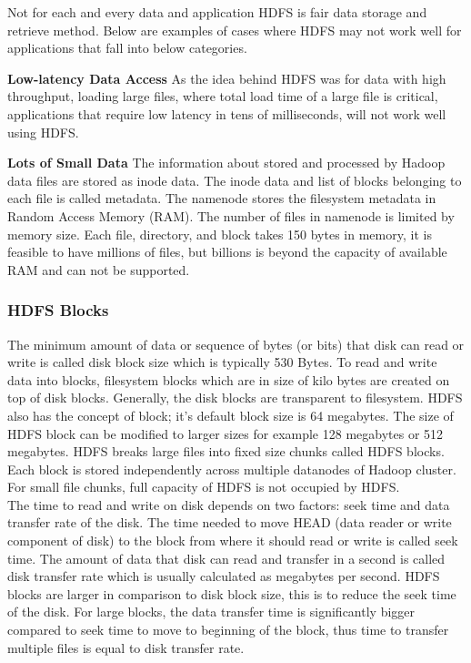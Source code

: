  Not for each and every data and application HDFS‌ is fair data storage and retrieve method. Below are examples of cases where HDFS‌ may not work well for applications that fall into below categories. \  

\textbf{Low-latency Data Access } As the idea behind HDFS was for data with high throughput, loading large files, where total load time of a large file is critical, applications that require low latency in tens of milliseconds, will not work well using HDFS.
 
\textbf{Lots of Small Data } The information about stored and processed by Hadoop data files are stored as inode data. The inode data and list of blocks belonging to each file is called metadata. The namenode stores the filesystem metadata in Random Access Memory (RAM). The number of files in namenode is limited by memory size. Each file, directory, and block takes 150 bytes in memory, it is feasible to have millions of files, but billions is beyond the capacity of available RAM and can not be supported.
   
\subsubsection{HDFS Blocks}
 
The minimum amount of data or sequence of bytes (or bits) that disk can read or write is called disk block size which is typically 530 Bytes. To read and write data into blocks, filesystem blocks which are in size of kilo bytes are created on top of disk blocks. Generally, the disk blocks are transparent to filesystem.\cite{tom3} HDFS also has the concept of block; it's default block size is 64 megabytes. The size of HDFS block can be modified to larger sizes for example 128 megabytes or 512 megabytes. HDFS breaks large files into fixed size chunks called HDFS blocks. Each block is stored independently across multiple datanodes of Hadoop cluster. For small file chunks, full capacity of HDFS is not occupied by HDFS. \\

 The time to read and write on disk depends on two factors: seek time and data transfer rate of the disk. The time needed to move HEAD (data reader or write component of disk) to the block from where it should read or write is called seek time. The amount of data that disk can read and transfer in a second is called disk transfer rate which is usually calculated as megabytes per second. HDFS blocks are larger in comparison to disk block size, this is to reduce the seek time of the disk. For large blocks, the data transfer time is significantly bigger compared to seek time to move to beginning of the block, thus time to transfer multiple files is equal to disk transfer rate.\\

